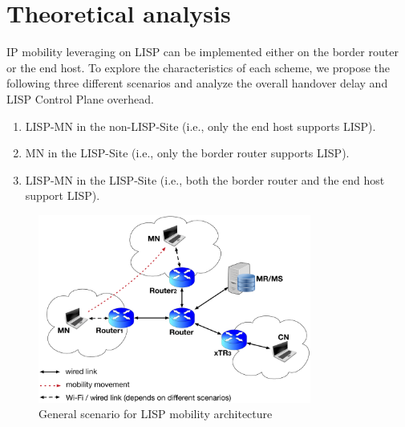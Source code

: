 \section{Theoretical analysis}
\label{sec:ns3_analysis}
IP mobility leveraging on LISP can be implemented either on the border router or the end host. To explore the characteristics of each scheme, we propose the following three different scenarios and analyze the overall handover delay and LISP Control Plane overhead. 
\begin{enumerate}[noitemsep,topsep=0pt]
	\item LISP-MN in the non-LISP-Site (i.e., only the end host supports LISP). 
	\item MN in the LISP-Site (i.e., only the border router supports LISP). 
	\item LISP-MN in the LISP-Site (i.e., both the border router and the end host support LISP). 
\end{enumerate}	
\begin{figure}[!t]
	\centering
	\includegraphics[width=0.8\textwidth]{Pics/LISP_mobility_archi}
	\caption{General scenario for LISP mobility architecture}
	\label{sim_archi}
\end{figure}

